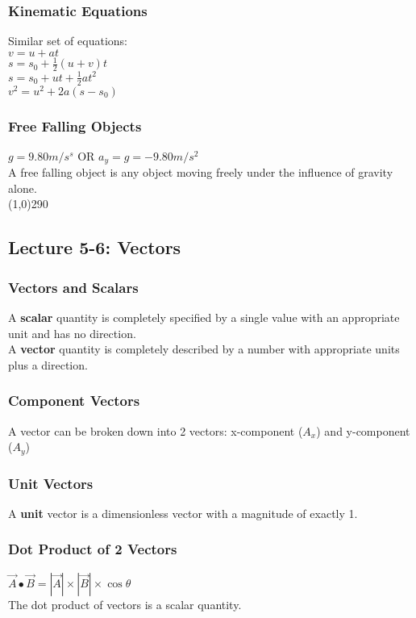 \documentclass[10 pt]{article}
\begin{document}
\begin{multicols}{2}
\subsubsection*{Kinematic Equations}
Similar set of equations:\\
$v = u + at$\\
$s = s_0 + \frac{1}{2}(u+v)t$\\
$s = s_0 + ut + \frac{1}{2}at^2$\\
$v^2 = u^2 + 2a(s-s_0)$
\subsubsection*{Free Falling Objects}
$g = 9.80 m/s^s$ OR $a_y = g = -9.80 m/s^2$\\
A free falling object is any object moving freely under the influence of gravity alone.
\\
\line(1,0){290}
\subsection*{Lecture 5-6: Vectors}
\subsubsection*{Vectors and Scalars}
A \textbf{scalar} quantity is completely specified by a single value with an appropriate unit and has no direction.\\
A \textbf{vector} quantity is completely described by a number with appropriate units plus a direction.
\subsubsection*{Component Vectors}
A vector can be broken down into 2 vectors: x-component ($A_x$) and y-component ($A_y$)
\subsubsection*{Unit Vectors}
A \textbf{unit} vector is a dimensionless vector with a magnitude of exactly 1.
\subsubsection*{Dot Product of 2 Vectors}
$\vec{A} \bullet \vec{B} = |\vec{A}| \times |\vec{B}| \times \cos{\theta}$\\
The dot product of vectors is a scalar quantity.

\end{multicols}
\end{document}
